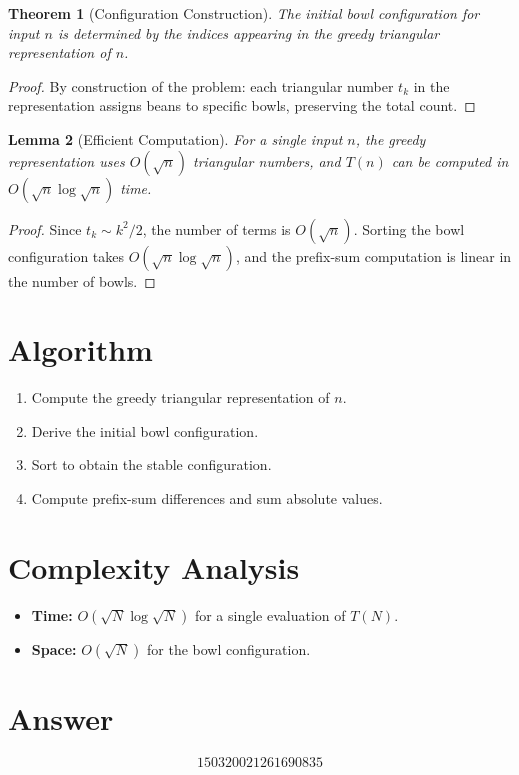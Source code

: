 \documentclass[12pt]{article}
\newtheorem{theorem}{Theorem}
\newtheorem{lemma}[theorem]{Lemma}
\theoremstyle{definition}
\begin{document}
\begin{theorem}[Configuration Construction]
The initial bowl configuration for input $n$ is determined by the indices appearing in the greedy triangular representation of $n$.
\end{theorem}

\begin{proof}
By construction of the problem: each triangular number $t_k$ in the representation assigns beans to specific bowls, preserving the total count.
\end{proof}

\begin{lemma}[Efficient Computation]
For a single input $n$, the greedy representation uses $O(\sqrt{n})$ triangular numbers, and $T(n)$ can be computed in $O(\sqrt{n} \log \sqrt{n})$ time.
\end{lemma}

\begin{proof}
Since $t_k \sim k^2/2$, the number of terms is $O(\sqrt{n})$. Sorting the bowl configuration takes $O(\sqrt{n} \log \sqrt{n})$, and the prefix-sum computation is linear in the number of bowls.
\end{proof}

\section{Algorithm}

\begin{enumerate}
    \item Compute the greedy triangular representation of $n$.
    \item Derive the initial bowl configuration.
    \item Sort to obtain the stable configuration.
    \item Compute prefix-sum differences and sum absolute values.
\end{enumerate}

\section{Complexity Analysis}

\begin{itemize}
    \item \textbf{Time:} $O(\sqrt{N} \log \sqrt{N})$ for a single evaluation of $T(N)$.
    \item \textbf{Space:} $O(\sqrt{N})$ for the bowl configuration.
\end{itemize}

\section{Answer}

\[
\boxed{150320021261690835}
\]
\end{document}
